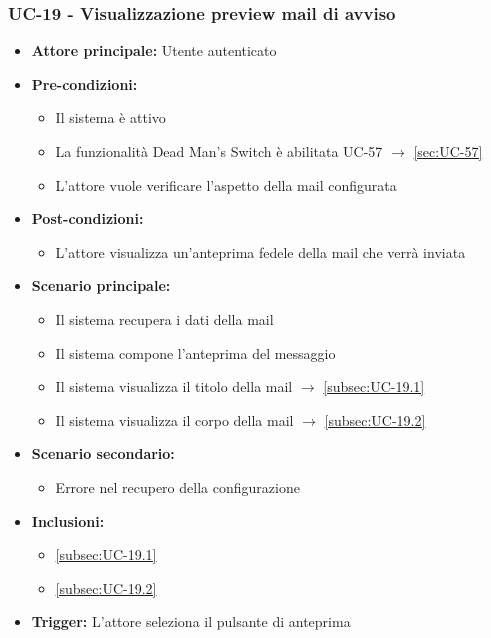 \documentclass[a4paper,12pt]{article}
\begin{document}
\subsubsection{UC-19 - Visualizzazione preview mail di avviso} \label{sec:UC-19}
\begin{itemize}
    \item \textbf{Attore principale:} Utente autenticato
    \item \textbf{Pre-condizioni:}
    \begin{itemize}
        \item Il sistema è attivo
        \item La funzionalità Dead Man's Switch è abilitata UC-57 $\rightarrow$ \ref{sec:UC-57}
        \item L'attore vuole verificare l'aspetto della mail configurata
    \end{itemize}
    \item \textbf{Post-condizioni:}
    \begin{itemize}
        \item L'attore visualizza un'anteprima fedele della mail che verrà inviata
    \end{itemize}
    \item \textbf{Scenario principale:} 
    \begin{itemize}
        \item Il sistema recupera i dati della mail
        \item Il sistema compone l'anteprima del messaggio
        \item Il sistema visualizza il titolo della mail $\rightarrow$ \ref{subsec:UC-19.1}
        \item Il sistema visualizza il corpo della mail $\rightarrow$ \ref{subsec:UC-19.2}
    \end{itemize}
    \item \textbf{Scenario secondario:} 
    \begin{itemize}
        \item Errore nel recupero della configurazione 
    \end{itemize}
    \item \textbf{Inclusioni:}
    \begin{itemize}
        \item \ref{subsec:UC-19.1}
        \item \ref{subsec:UC-19.2}
    \end{itemize}
    \item \textbf{Trigger:} L'attore seleziona il pulsante di anteprima
\end{itemize}
\end{document}
